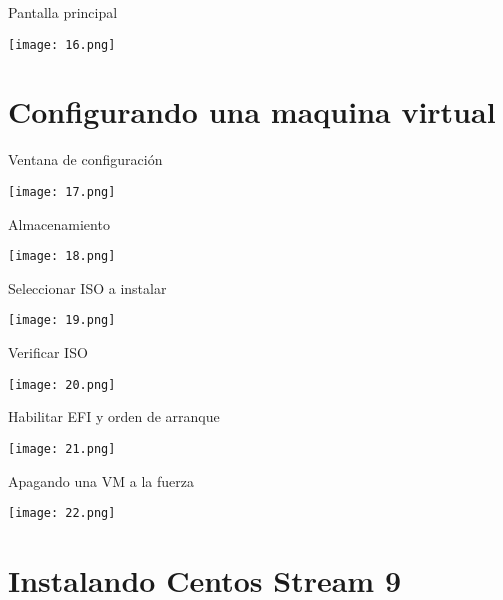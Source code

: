 \begin{frame}[c]{Pantalla principal}
  \begin{center}
    \texttt{[image: 16.png]}
  \end{center}
\end{frame}

\section{Configurando una maquina virtual}

\begin{frame}[c]{Ventana de configuración}
  \begin{center}
    \texttt{[image: 17.png]}
  \end{center}
\end{frame}

\begin{frame}[c]{Almacenamiento}
  \begin{center}
    \texttt{[image: 18.png]}
  \end{center}
\end{frame}

\begin{frame}[c]{Seleccionar ISO a instalar}
  \begin{center}
    \texttt{[image: 19.png]}
  \end{center}
\end{frame}

\begin{frame}[c]{Verificar ISO}
  \begin{center}
    \texttt{[image: 20.png]}
  \end{center}
\end{frame}

\begin{frame}[c]{Habilitar EFI y orden de arranque}
  \begin{center}
    \texttt{[image: 21.png]}
  \end{center}
\end{frame}

\begin{frame}[c]{Apagando una VM a la fuerza}
  \begin{center}
    \texttt{[image: 22.png]}
  \end{center}
\end{frame}

\section{Instalando Centos Stream 9}

